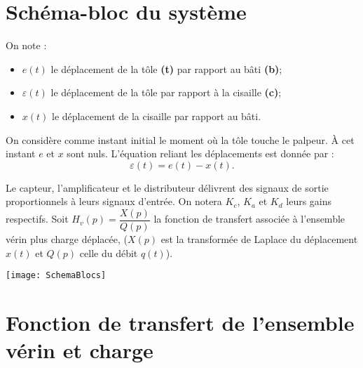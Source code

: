 \begin{multicols}{2}
\fi
\section*{Schéma-bloc du système}
\ifprof
\else
On note : 
\begin{itemize}
\item $e(t)$ le déplacement de la tôle \textbf{(t)} par rapport au bâti \textbf{(b)};
\item $\varepsilon(t)$ le déplacement de la tôle par rapport à la cisaille \textbf{(c)};
\item $x(t)$ le déplacement de la cisaille par rapport au bâti. 
\end{itemize}
On considère comme instant initial le moment où la tôle touche le palpeur. À cet instant $e$ et $x$ sont nuls. L'équation reliant les déplacements est donnée par :
$$\varepsilon(t)=e(t)-x(t).$$


Le capteur, l'amplificateur et le distributeur délivrent des signaux de sortie proportionnels à leurs signaux d'entrée. On notera $K_c$, $K_a$ et $K_d$ leurs gains respectifs. 
Soit  $H_v(p)=\dfrac{X(p)}{Q(p)}$ la fonction de transfert associée à l'ensemble vérin plus charge déplacée, ($X(p)$ est la transformée de Laplace du déplacement $x(t)$ et $Q(p)$ celle du débit $q(t)$).
\fi


\ifprof \begin{corrige}
\begin{center}
\texttt{[image: SchemaBlocs]}
\end{center}
\end{corrige} \else \fi

\section*{Fonction de transfert de l'ensemble vérin et charge}

\end{multicols}
